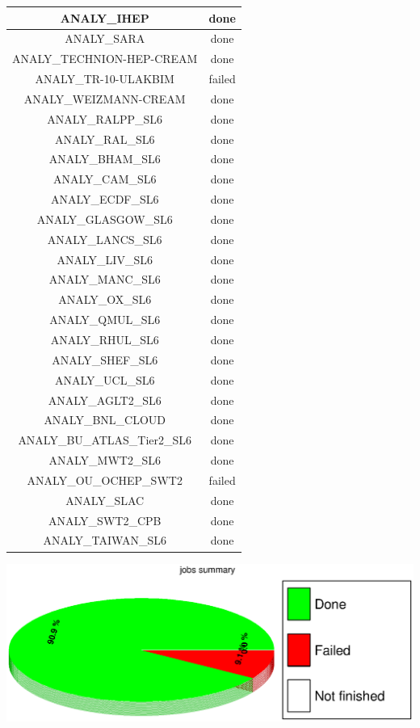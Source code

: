 \begin{longtable}{|c|c|}
	\hline
	\color{black}ANALY\_IHEP & \color{green}done \\
	\hline
	\color{black}ANALY\_SARA & \color{green}done \\
	\hline
	\color{black}ANALY\_TECHNION-HEP-CREAM & \color{green}done \\
	\hline
	\color{black}ANALY\_TR-10-ULAKBIM & \color{red}failed \\
	\hline
	\color{black}ANALY\_WEIZMANN-CREAM & \color{green}done \\
	\hline
	\color{black}ANALY\_RALPP\_SL6 & \color{green}done \\
	\hline
	\color{black}ANALY\_RAL\_SL6 & \color{green}done \\
	\hline
	\color{black}ANALY\_BHAM\_SL6 & \color{green}done \\
	\hline
	\color{black}ANALY\_CAM\_SL6 & \color{green}done \\
	\hline
	\color{black}ANALY\_ECDF\_SL6 & \color{green}done \\
	\hline
	\color{black}ANALY\_GLASGOW\_SL6 & \color{green}done \\
	\hline
	\color{black}ANALY\_LANCS\_SL6 & \color{green}done \\
	\hline
	\color{black}ANALY\_LIV\_SL6 & \color{green}done \\
	\hline
	\color{black}ANALY\_MANC\_SL6 & \color{green}done \\
	\hline
	\color{black}ANALY\_OX\_SL6 & \color{green}done \\
	\hline
	\color{black}ANALY\_QMUL\_SL6 & \color{green}done \\
	\hline
	\color{black}ANALY\_RHUL\_SL6 & \color{green}done \\
	\hline
	\color{black}ANALY\_SHEF\_SL6 & \color{green}done \\
	\hline
	\color{black}ANALY\_UCL\_SL6 & \color{green}done \\
	\hline
	\color{black}ANALY\_AGLT2\_SL6 & \color{green}done \\
	\hline
	\color{black}ANALY\_BNL\_CLOUD & \color{green}done \\
	\hline
	\color{black}ANALY\_BU\_ATLAS\_Tier2\_SL6 & \color{green}done \\
	\hline
	\color{black}ANALY\_MWT2\_SL6 & \color{green}done \\
	\hline
	\color{black}ANALY\_OU\_OCHEP\_SWT2 & \color{red}failed \\
	\hline
	\color{black}ANALY\_SLAC & \color{green}done \\
	\hline
	\color{black}ANALY\_SWT2\_CPB & \color{green}done \\
	\hline
	\color{black}ANALY\_TAIWAN\_SL6 & \color{green}done \\
\hline

\end{longtable}
\includegraphics[width=\textwidth]{../PieChart/job/xcanvas.eps}
